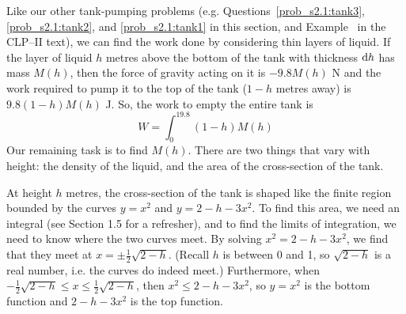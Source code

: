 \begin{solution}
Like our other tank-pumping problems (e.g. Questions~\ref{prob_s2.1:tank3}, \ref{prob_s2.1:tank2}, and \ref{prob_s2.1:tank1} in this section, and Example~ in the CLP--II text), we can find the work done by considering thin layers of liquid. If the layer of liquid $h$ metres above the bottom of the tank with thickness $\mathrm{d}h$ has mass $M(h)$, then the force of gravity acting on it is $-9.8M(h)$ N and the work required to pump it to the top of the tank ($1-h$ metres away) is $9.8(1-h)M(h)$ J. So, the work to empty the entire tank is
\[W = \int_0^19.8(1-h)M(h) \tag{$*$} \]
Our  remaining task is to find $M(h)$. There are two things that vary with height: the density of the liquid, and the area of the cross-section of the tank.

At  height $h$ metres, the cross-section of the tank is shaped like the finite region bounded by the curves $y=x^2$ and $y=2-h-3x^2$. To find this area, we need an integral (see Section 1.5 for a refresher), and to find the limits of integration, we need to know where the two curves meet. By solving $x^2 =2-h-3x^2$, we find that they meet at $x = \pm\frac{1}{2}\sqrt{2-h}$. (Recall $h$ is between 0 and 1, so $\sqrt{2-h}$ is a real number, i.e. the curves do indeed meet.) Furthermore, when $-\frac{1}{2}\sqrt{2-h}\le x \le \frac{1}{2}\sqrt{2-h}$, then $x^2 \leq 2-h-3x^2$, so $y=x^2$ is the bottom function and $2-h-3x^2$ is the top function.

\begin{center}
\end{center}


\end{solution}

